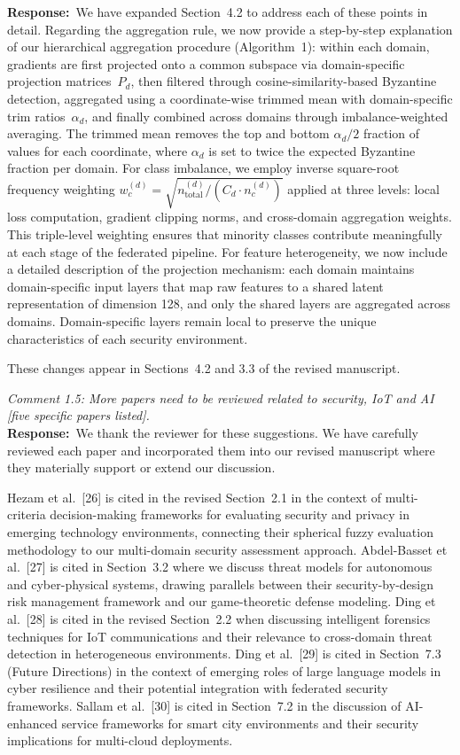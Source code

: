 \documentclass[12pt,a4paper]{article}
\newcommand{\RC}[1]{\noindent\textit{#1}\vspace{0.3em}\\}
\newcommand{\AR}{\noindent\textbf{Response:}~}
\begin{document}
\AR We have expanded Section~4.2 to address each of these points in detail. Regarding the aggregation rule, we now provide a step-by-step explanation of our hierarchical aggregation procedure (Algorithm~1): within each domain, gradients are first projected onto a common subspace via domain-specific projection matrices~$P_d$, then filtered through cosine-similarity-based Byzantine detection, aggregated using a coordinate-wise trimmed mean with domain-specific trim ratios~$\alpha_d$, and finally combined across domains through imbalance-weighted averaging. The trimmed mean removes the top and bottom $\alpha_d/2$ fraction of values for each coordinate, where $\alpha_d$ is set to twice the expected Byzantine fraction per domain. For class imbalance, we employ inverse square-root frequency weighting $w_c^{(d)} = \sqrt{n_{\text{total}}^{(d)}/(C_d \cdot n_c^{(d)})}$ applied at three levels: local loss computation, gradient clipping norms, and cross-domain aggregation weights. This triple-level weighting ensures that minority classes contribute meaningfully at each stage of the federated pipeline. For feature heterogeneity, we now include a detailed description of the projection mechanism: each domain maintains domain-specific input layers that map raw features to a shared latent representation of dimension 128, and only the shared layers are aggregated across domains. Domain-specific layers remain local to preserve the unique characteristics of each security environment.

These changes appear in Sections~4.2 and 3.3 of the revised manuscript.

\vspace{0.8em}

\RC{Comment 1.5: More papers need to be reviewed related to security, IoT and AI [five specific papers listed].}

\AR We thank the reviewer for these suggestions. We have carefully reviewed each paper and incorporated them into our revised manuscript where they materially support or extend our discussion.

Hezam et al.~[26] is cited in the revised Section~2.1 in the context of multi-criteria decision-making frameworks for evaluating security and privacy in emerging technology environments, connecting their spherical fuzzy evaluation methodology to our multi-domain security assessment approach. Abdel-Basset et al.~[27] is cited in Section~3.2 where we discuss threat models for autonomous and cyber-physical systems, drawing parallels between their security-by-design risk management framework and our game-theoretic defense modeling. Ding et al.~[28] is cited in the revised Section~2.2 when discussing intelligent forensics techniques for IoT communications and their relevance to cross-domain threat detection in heterogeneous environments. Ding et al.~[29] is cited in Section~7.3 (Future Directions) in the context of emerging roles of large language models in cyber resilience and their potential integration with federated security frameworks. Sallam et al.~[30] is cited in Section~7.2 in the discussion of AI-enhanced service frameworks for smart city environments and their security implications for multi-cloud deployments.
\end{document}
